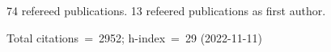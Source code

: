 74 refereed publications. 13 refeered publications as first author.

Total citations~=~2952; h-index~=~29 (2022-11-11)